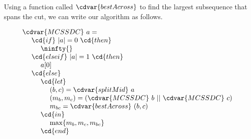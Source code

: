 \begin{algorithm}
\label{alg:mcss::dc::first}
Using a function called $\cdvar{bestAcross}$ to find the largest
subsequence that spans the cut, we can write our algorithm as follows.

\[
\begin{array}{l}
\cdvar{MCSSDC}~a =
\\
~~~~\cd{if}~ |a| = 0~\cd{then}
\\
~~~~~~~~\ninfty{}
\\
~~~~\cd{else if}~|a| = 1 ~\cd{then}
\\ 
~~~~~~~~a[0]
\\
~~~~\cd{else}
\\ 
~~~~~~~~\cd{let}
\\ 
~~~~~~~~~~~~(b, c)  = \cdvar{splitMid}~a
\\ 
~~~~~~~~~~~~(m_b, m_c) = \left( \cdvar{MCSSDC}~b \ ||\ \cdvar{MCSSDC}~c \right)
\\ 
~~~~~~~~~~~~m_{bc} = \cdvar{bestAcross}~(b, c)
\\ 
~~~~~~~~\cd{in}
\\ 
~~~~~~~~~~~~\max\{m_b, m_c, m_{bc}\}
\\ 
~~~~~~~~\cd{end}
\end{array} 
\]
\end{algorithm}


